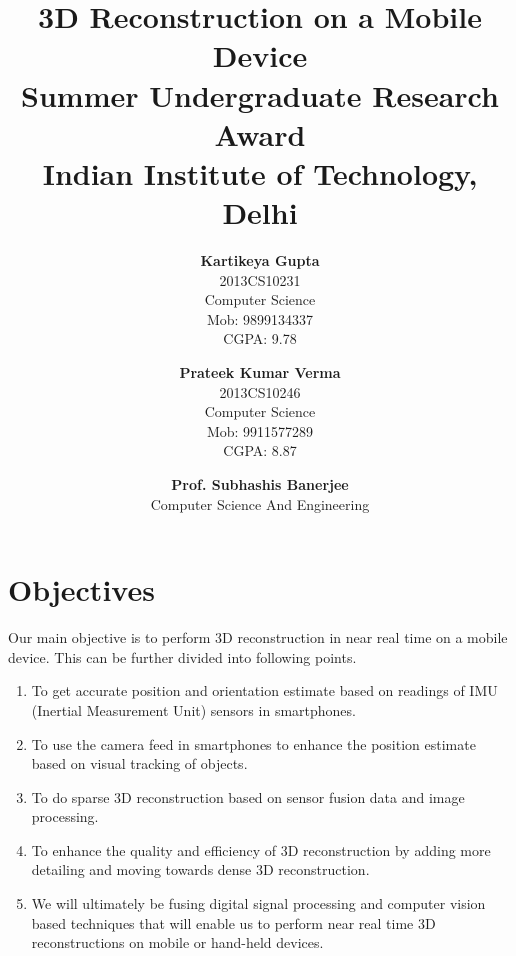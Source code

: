 \documentclass{article}
\title{\vspace*{\fill} \textbf{3D Reconstruction on a Mobile Device}
	  \\ {\large \textbf{Summer Undergraduate Research Award}}
	  \\ {\large \textbf{Indian Institute of Technology, Delhi}}}
\author{
	\textbf{Kartikeya Gupta}\\ 
	2013CS10231\\
	Computer Science\\
	Mob: 9899134337\\
	CGPA: 9.78
	\and
	\textbf{Prateek Kumar Verma}\\ 
	2013CS10246\\
	Computer Science\\
	Mob: 9911577289\\
	CGPA: 8.87
}
\date{\textbf{Prof. Subhashis Banerjee} \\ Computer Science And Engineering \vspace*{\fill}}
\begin{document}
	\maketitle

	\newpage
	\section{Objectives} Our main objective is to perform 3D reconstruction in near real time on a mobile device. This can be further divided into following points.
		\begin{enumerate}
			\item 
				To get accurate position and orientation estimate based on readings of IMU (Inertial Measurement Unit) sensors in smartphones. 
			\item
				To use the camera feed in smartphones to enhance the position estimate based on visual tracking of objects.
			\item 
				To do sparse 3D reconstruction based on sensor fusion data and image processing.
			\item
				To enhance the quality and efficiency of 3D reconstruction by adding more detailing and moving towards dense 3D reconstruction.
			\item
				We will ultimately be fusing digital signal processing and computer vision based techniques that will enable us to perform near real time 3D reconstructions on mobile or hand-held devices.
		\end{enumerate}
\end{document}
